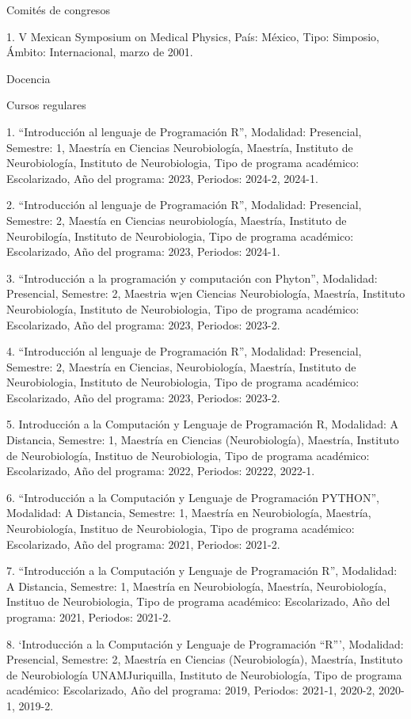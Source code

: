 \documentclass[12pt]{article}
\begin{document}
Comités de congresos

1. V Mexican Symposium on Medical Physics, País: México, Tipo: Simposio, Ámbito: Internacional, marzo de 2001.

Docencia

Cursos regulares

1. “Introducción al lenguaje de Programación R”, Modalidad: Presencial, Semestre: 1, Maestría en Ciencias 
Neurobiología, Maestría, Instituto de Neurobiología, Instituto de Neurobiologia, Tipo de programa académico: Escolarizado, Año del 
programa: 2023, Periodos: 2024-2, 2024-1.

2. “Introducción al lenguaje de Programación R”, Modalidad: Presencial, Semestre: 2, Maestía en Ciencias neurobiología, Maestría, 
Instituto de Neurobilogía, Instituto de Neurobiologia, Tipo de programa académico: Escolarizado, Año del programa: 2023, Periodos: 
2024-1.

3. “Introducción a la programación y computación con Phyton”, Modalidad: Presencial, Semestre: 2, Maestria w¡en Ciencias Neurobiología, 
Maestría, Instituto Neurobiología, Instituto de Neurobiologia, Tipo de programa académico: Escolarizado, Año del programa: 2023, 
Periodos: 2023-2.

4. “Introducción al lenguaje de Programación R”, Modalidad: Presencial, Semestre: 2, Maestría en Ciencias, Neurobiología, Maestría, 
Instituto de Neurobiologia, Instituto de Neurobiologia, Tipo de programa académico: Escolarizado, Año del programa: 2023, Periodos: 
2023-2.

5. Introducción a la Computación y Lenguaje de Programación R, Modalidad: A Distancia, Semestre: 1, Maestría en Ciencias 
(Neurobiología), Maestría, Instituto de Neurobiología, Instituo de Neurobiologia, Tipo de programa académico: Escolarizado, Año del 
programa: 2022, Periodos: 20222, 2022-1.

6. “Introducción a la Computación y Lenguaje de Programación PYTHON”, Modalidad: A Distancia, Semestre: 1, Maestría en Neurobiología, 
Maestría, Neurobiología, Instituo de Neurobiologia, Tipo de programa académico: Escolarizado, Año del programa: 2021, Periodos: 2021-2.

7. “Introducción a la Computación y Lenguaje de Programación R”, Modalidad: A Distancia, Semestre: 1, Maestría en Neurobiología, 
Maestría, Neurobiología, Instituo de Neurobiologia, Tipo de programa académico: Escolarizado, Año del programa: 2021, Periodos: 2021-2.

8. ‘Introducción a la Computación y Lenguaje de Programación “R”’, Modalidad: Presencial, Semestre: 2, Maestría en Ciencias 
(Neurobiología), Maestría, Instituto de Neurobiología UNAMJuriquilla, Instituto de Neurobiología, Tipo de programa académico: 
Escolarizado, Año del programa: 2019, Periodos: 2021-1, 2020-2, 2020-1, 2019-2.
\end{document}
